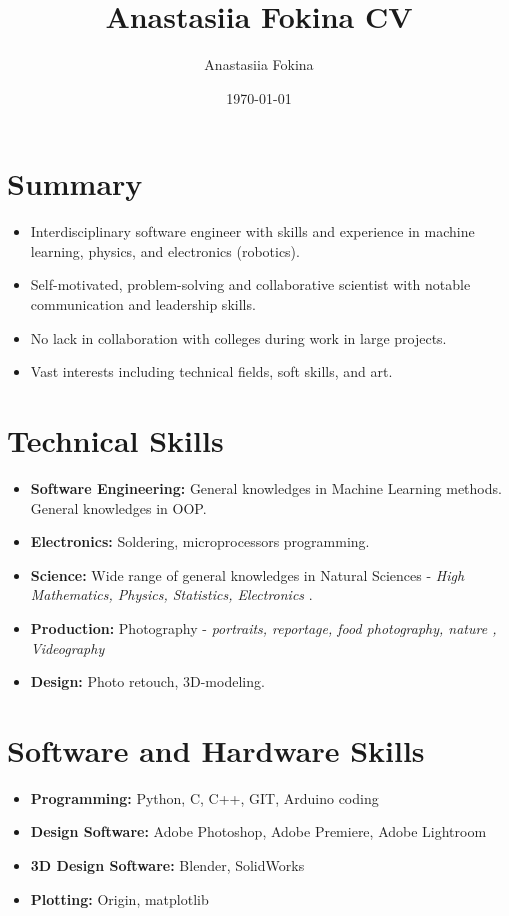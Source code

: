 \documentclass{article}
\title{ Anastasiia Fokina CV}
\author{Anastasiia Fokina}
\date{\today}
\begin{document}

\makecvtitle %

\section{Summary}
\begin{itemize}
\item Interdisciplinary software engineer with skills and experience in machine learning, physics, and electronics (robotics).
\item Self-motivated, problem-solving and collaborative scientist with notable communication and leadership skills.
\item No lack in collaboration with colleges during work in large projects.
\item Vast interests including technical fields, soft skills,  and art.
\end{itemize}

\section{Technical Skills}

\begin{itemize}
\item \textbf{Software Engineering:} General knowledges in Machine Learning methods. General knowledges in OOP.
\item \textbf{Electronics:} Soldering, microprocessors programming.
\item \textbf{Science:} Wide range of general knowledges in Natural Sciences - \textit{High Mathematics, Physics, Statistics, Electronics }.
\item \textbf{Production:} Photography - \textit{portraits, reportage, food photography, nature , Videography}
\item \textbf{Design:} Photo retouch, 3D-modeling.


\end{itemize}

\section{Software and Hardware Skills}
\begin{itemize}
\item \textbf{Programming:} Python, C, C++, GIT, Arduino coding
\item \textbf{Design Software:} Adobe Photoshop, Adobe Premiere, Adobe Lightroom
\item \textbf{3D Design Software:} Blender, SolidWorks
\item \textbf{Plotting:} Origin, matplotlib
\end{itemize}
\end{document}

